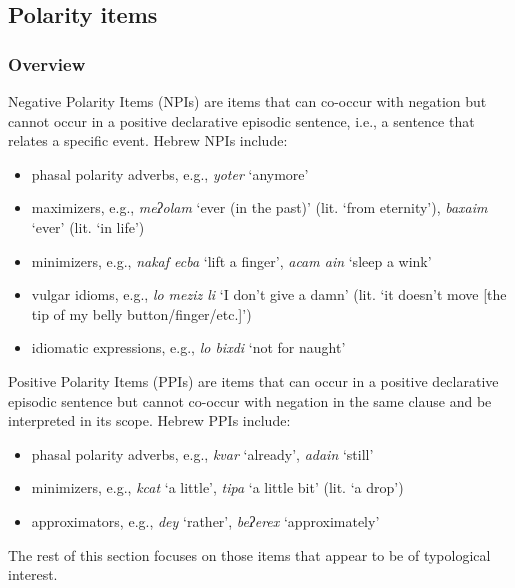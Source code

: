\documentclass[output=paper,colorlinks,citecolor=brown]{langscibook}
\begin{document}
\subsection{Polarity items} \label{sec:heb:4.2}
\subsubsection{Overview}
Negative Polarity Items (NPIs) are items that can co-occur with negation but cannot occur in a positive declarative episodic sentence, i.e., a sentence that relates a specific event. Hebrew NPIs include:

\begin{itemize}
\item 
phasal polarity adverbs, e.g., \textit{yoter} ‘anymore’

\item 
maximizers, e.g., \textit{meʔolam} ‘ever (in the past)’ (lit. ‘from eternity’), \textit{baxaim} ‘ever’ (lit. ‘in life’)

\item 
minimizers, e.g., \textit{nakaf ecba} ‘lift a finger’, \textit{acam ain} ‘sleep a wink’

\item 
vulgar idioms, e.g., \textit{lo meziz li} ‘I don’t give a damn’ (lit. ‘it doesn’t move [the tip of my belly button/finger/etc.]’)

\item 
idiomatic expressions, e.g., \textit{lo bixdi} ‘not for naught’

\end{itemize}

Positive Polarity Items (PPIs) are items that can occur in a positive declarative episodic sentence but cannot co-occur with negation in the same clause and be interpreted in its scope. Hebrew PPIs include: 

\begin{itemize}
\item 
phasal polarity adverbs, e.g., \textit{kvar} ‘already’, \textit{adain} ‘still’

\item 
minimizers, e.g., \textit{kcat} ‘a little’, \textit{tipa} ‘a little bit’ (lit. ‘a drop’)

\item 
approximators, e.g., \textit{dey} ‘rather’, \textit{beʔerex} ‘approximately’

\end{itemize}

The rest of this section focuses on those items that appear to be of typological interest.
\end{document}
